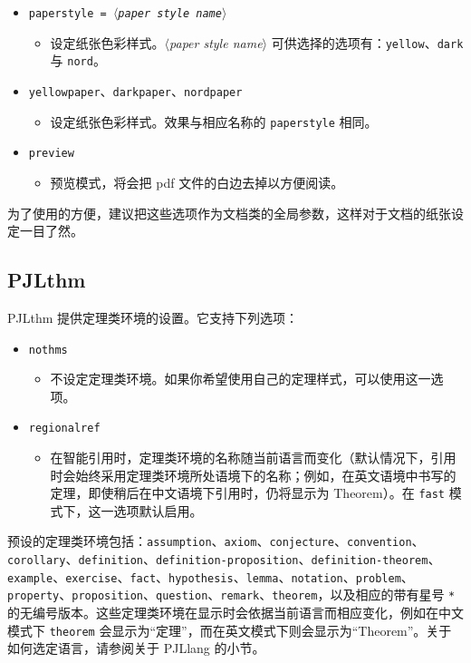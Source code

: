 \documentclass[allowbf]{lebhart}
\providecommand{\meta}[1]{$\langle${\normalfont\itshape#1}$\rangle$}
\providecommand{\PJLlang}{\textsf{PJLlang}}
\providecommand{\PJLthm}{\textsf{PJLthm}}
\begin{document}
\begin{itemize}
    \item \texttt{paperstyle = \meta{paper style name}}
        \begin{itemize}
            \item 设定纸张色彩样式。\meta{paper style name} 可供选择的选项有：\texttt{yellow}、\texttt{dark} 与 \texttt{nord}。
        \end{itemize}
    \item \texttt{yellowpaper}、\texttt{darkpaper}、\texttt{nordpaper}
        \begin{itemize}
            \item 设定纸张色彩样式。效果与相应名称的 \texttt{paperstyle} 相同。
        \end{itemize}
    \item \texttt{preview}
        \begin{itemize}
            \item 预览模式，将会把 pdf 文件的白边去掉以方便阅读。
        \end{itemize}
\end{itemize}

为了使用的方便，建议把这些选项作为文档类的全局参数，这样对于文档的纸张设定一目了然。

\subsection{PJLthm}

\PJLthm{} 提供定理类环境的设置。它支持下列选项：
\begin{itemize}
    \item \texttt{nothms}
    \begin{itemize}
        \item 不设定定理类环境。如果你希望使用自己的定理样式，可以使用这一选项。
    \end{itemize}
    \item \texttt{regionalref}
    \begin{itemize}
        \item 在智能引用时，定理类环境的名称随当前语言而变化（默认情况下，引用时会始终采用定理类环境所处语境下的名称；例如，在英文语境中书写的定理，即使稍后在中文语境下引用时，仍将显示为 Theorem）。在 \texttt{fast} 模式下，这一选项默认启用。
    \end{itemize}
\end{itemize}

预设的定理类环境包括：\texttt{assumption}、\texttt{axiom}、\texttt{conjecture}、\texttt{convention}、\texttt{corollary}、\texttt{definition}、\texttt{definition-proposition}、\texttt{definition-theorem}、\texttt{example}、\texttt{exercise}、\texttt{fact}、\texttt{hypothesis}、\texttt{lemma}、\texttt{notation}、\texttt{problem}、\texttt{property}、\texttt{proposition}、\texttt{question}、\texttt{remark}、\texttt{theorem}，以及相应的带有星号 \lstinline|*| 的无编号版本。这些定理类环境在显示时会依据当前语言而相应变化，例如在中文模式下 \texttt{theorem} 会显示为“定理”，而在英文模式下则会显示为“Theorem”。关于如何选定语言，请参阅关于 \PJLlang{} 的小节。
\end{document}
